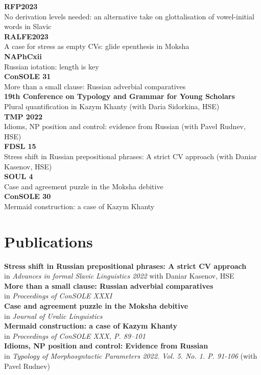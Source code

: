 \documentclass[11pt]{article} %
\begin{document}
 \textbf{RFP2023}\\ No derivation levels needed: an alternative take on glottalisation of vowel-initial words in Slavic\\
 \textbf{RALFE2023}\\ A case for stress as empty CVs: glide epenthesis in Moksha\\
 \textbf{NAPhCxii}\\ Russian iotation: length is key\\
 \textbf{ConSOLE 31}\\ More than a small clause: Russian adverbial comparatives\\
 \textbf{19th Conference on Typology and Grammar for Young Scholars}\\ Plural quantification in Kazym Khanty (with Daria Sidorkina, HSE)\\
 \textbf{TMP 2022} \\Idioms, NP position and control: evidence from Russian (with Pavel Rudnev, HSE)\\
 \textbf{FDSL 15} \\Stress shift in Russian prepositional phrases: A strict CV approach (with Daniar Kasenov, HSE)\\
 \textbf{SOUL 4}\\ Case and agreement puzzle in the Moksha debitive\\
 \textbf{ConSOLE 30}\\ Mermaid construction: a case of Kazym Khanty\\

\section*{Publications}
 \textbf{Stress shift in Russian prepositional phrases: A strict CV approach} \\ in \emph{Advances in formal Slavic Linguistics 2022} with Daniar Kasenov, HSE\\
 \textbf{More than a small clause: Russian adverbial comparatives} \\ in \emph{Proceedings of ConSOLE XXXI}\\
 \textbf{Case and agreement puzzle in the Moksha debitive} \\ in \emph{Journal of Uralic Linguistics}\\
 \textbf{Mermaid construction: a case of Kazym Khanty}\\ in \emph{Proceedings of ConSOLE XXX, P. 89--101}\\
 \textbf{Idioms, NP position and control: Evidence from Russian}\\ in \emph{Typology of Morphosyntactic Parameters 2022. Vol. 5. No. 1. P. 91-106} (with Pavel Rudnev)\\
\end{document}
